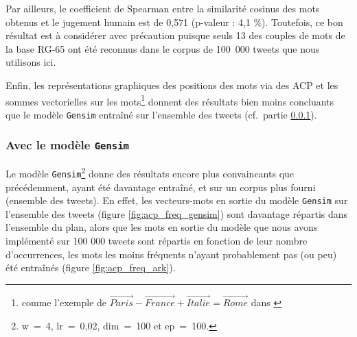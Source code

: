\documentclass[11pt,french,french]{article}
\let\rmarkdownfootnote\footnote%
\def\footnote{\protect\rmarkdownfootnote}
\begin{document}
Par ailleurs, le coefficient de Spearman entre la similarité cosinus des mots obtenus et le jugement humain est de 0,571 (p-valeur : 4,1 \%). Toutefois, ce bon résultat est à considérer avec précaution puisque seuls 13 des couples de mots de la base RG-65 ont été reconnus dans le corpus de 100~000 tweets que nous utilisons ici.

Enfin, les représentations graphiques des positions des mots via des ACP et les sommes vectorielles sur les mots\footnote{comme l'exemple de \(\overrightarrow{Paris} - \overrightarrow{France} + \overrightarrow{Italie} = \overrightarrow{Rome}\) dans \cite{Mikolov}} donnent des résultats bien moins concluants que le modèle \texttt{Gensim} entraîné sur l'ensemble des tweets (cf.~partie \ref{sec:gensimresultats}).

\hypertarget{sec:gensimresultats}{%
\subsubsection{\texorpdfstring{Avec le modèle \texttt{Gensim}}{Avec le modèle Gensim}}\label{sec:gensimresultats}}

Le modèle \texttt{Gensim}\footnote{w~=~4, lr~=~0,02, dim~=~100 et ep~=~100.} donne des résultats encore plus convaincants que précédemment, ayant été davantage entraîné, et sur un corpus plus fourni (ensemble des tweets). En effet, les vecteurs-mots en sortie du modèle \texttt{Gensim} sur l'ensemble des tweets (figure \ref{fig:acp_freq_gensim}) sont davantage répartis dans l'ensemble du plan, alors que les mots en sortie du modèle que nous avons implémenté sur 100 000 tweets sont répartis en fonction de leur nombre d'occurrences, les mots les moins fréquents n'ayant probablement pas (ou peu) été entraînés (figure \ref{fig:acp_freq_ark}).
\end{document}
